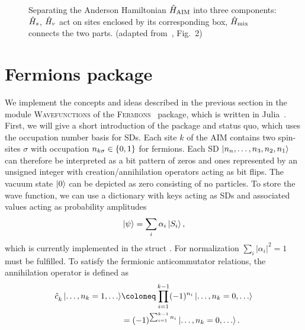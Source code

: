 \begin{figure}[ht]
    \centering
    
    \caption{
        Separating the Anderson Hamiltonian $\hat{H}_\text{AIM}$
        into three components:
        $\hat{H}_s$, $\hat{H}_v$ act on sites enclosed by its corresponding box,
        $\hat{H}_\text{mix}$ connects the two parts.
        (adapted from~\cite{Lu2019}, Fig.~2)
    }
    \label{fig:wave-function-split}
\end{figure}

\section{Fermions package}

We implement the concepts and ideas described in the previous section
in the module \textsc{Wavefunctions} of the
\textsc{Fermions}~\cite{Wallerberger2022} package,
which is written in Julia~\cite{Bezanson2017}.
First, we will give a short introduction of the package
and status quo,
which uses the occupation number basis for SDs.
Each site $k$ of the AIM contains two spin-sites $\sigma$
with occupation $n_{k\sigma} \in \{0, 1\}$ for fermions.
Each SD $\ket{n_n, \ldots, n_3, n_2, n_1}$
can therefore be interpreted as a bit pattern of zeros and ones
represented by an unsigned integer
with creation/annihilation operators acting as bit flips.
The vacuum state $\ket{0}$ can be depicted as zero consisting of no particles.
To store the wave function,
we can use a dictionary with keys acting as SDs
and associated values acting as probability amplitudes
\begin{equation}
    \ket{\psi} = \sum_i \alpha_i \ket{S_i},
\end{equation}
which is currently implemented in the struct .
For normalization $\sum_i |\alpha_i|^2=1$ must be fulfilled.
To satisfy the fermionic anticommutator relations,
the annihilation operator is defined as
\begin{equation}
    \label{eq:anticommutator-definition}
    \begin{split}
        \cc_k \ket{\ldots, n_k=1, \ldots}
         & \coloneq \prod_{i=1}^{k-1} (-1)^{n_i} \ket{\ldots, n_k=0, \ldots} \\
         & = (-1)^{\sum_{i=1}^{k-1} n_i} \ket{\ldots, n_k=0, \ldots}.
    \end{split}
\end{equation}
